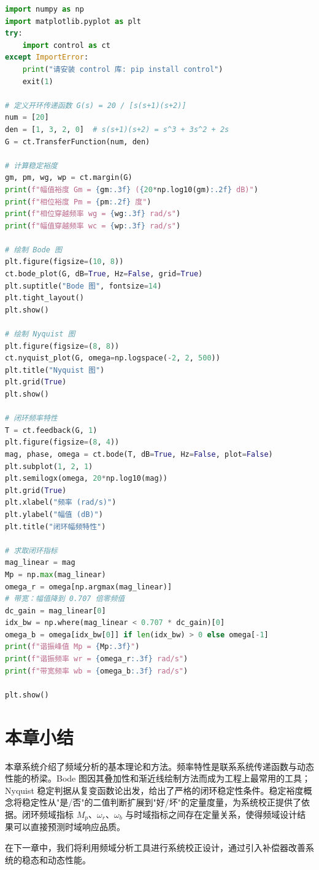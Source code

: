 \begin{lstlisting}[language=Python]
import numpy as np
import matplotlib.pyplot as plt
try:
    import control as ct
except ImportError:
    print("请安装 control 库: pip install control")
    exit(1)

# 定义开环传递函数 G(s) = 20 / [s(s+1)(s+2)]
num = [20]
den = [1, 3, 2, 0]  # s(s+1)(s+2) = s^3 + 3s^2 + 2s
G = ct.TransferFunction(num, den)

# 计算稳定裕度
gm, pm, wg, wp = ct.margin(G)
print(f"幅值裕度 Gm = {gm:.3f} ({20*np.log10(gm):.2f} dB)")
print(f"相位裕度 Pm = {pm:.2f} 度")
print(f"相位穿越频率 wg = {wg:.3f} rad/s")
print(f"幅值穿越频率 wc = {wp:.3f} rad/s")

# 绘制 Bode 图
plt.figure(figsize=(10, 8))
ct.bode_plot(G, dB=True, Hz=False, grid=True)
plt.suptitle("Bode 图", fontsize=14)
plt.tight_layout()
plt.show()

# 绘制 Nyquist 图
plt.figure(figsize=(8, 8))
ct.nyquist_plot(G, omega=np.logspace(-2, 2, 500))
plt.title("Nyquist 图")
plt.grid(True)
plt.show()

# 闭环频率特性
T = ct.feedback(G, 1)
plt.figure(figsize=(8, 4))
mag, phase, omega = ct.bode(T, dB=True, Hz=False, plot=False)
plt.subplot(1, 2, 1)
plt.semilogx(omega, 20*np.log10(mag))
plt.grid(True)
plt.xlabel("频率 (rad/s)")
plt.ylabel("幅值 (dB)")
plt.title("闭环幅频特性")

# 求取闭环指标
mag_linear = mag
Mp = np.max(mag_linear)
omega_r = omega[np.argmax(mag_linear)]
# 带宽：幅值降到 0.707 倍零频值
dc_gain = mag_linear[0]
idx_bw = np.where(mag_linear < 0.707 * dc_gain)[0]
omega_b = omega[idx_bw[0]] if len(idx_bw) > 0 else omega[-1]
print(f"谐振峰值 Mp = {Mp:.3f}")
print(f"谐振频率 wr = {omega_r:.3f} rad/s")
print(f"带宽频率 wb = {omega_b:.3f} rad/s")

plt.show()
\end{lstlisting}

\section{本章小结}

本章系统介绍了频域分析的基本理论和方法。频率特性是联系系统传递函数与动态性能的桥梁。Bode 图因其叠加性和渐近线绘制方法而成为工程上最常用的工具；Nyquist 稳定判据从复变函数论出发，给出了严格的闭环稳定性条件。稳定裕度概念将稳定性从"是/否"的二值判断扩展到"好/坏"的定量度量，为系统校正提供了依据。闭环频域指标 $M_p$、$\omega_r$、$\omega_b$ 与时域指标之间存在定量关系，使得频域设计结果可以直接预测时域响应品质。

在下一章中，我们将利用频域分析工具进行系统校正设计，通过引入补偿器改善系统的稳态和动态性能。

